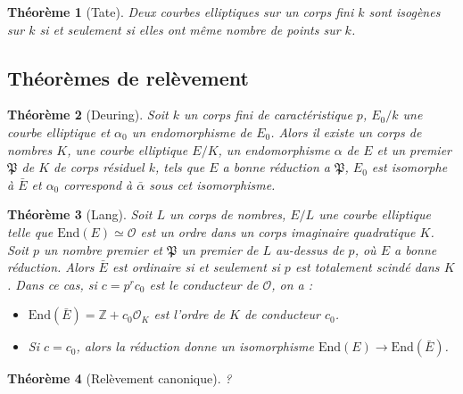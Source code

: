 \documentclass[11pt,a4paper]{article}
\newcommand{\Z}{\mathbb{Z}}
\renewcommand{\O}{\mathcal{O}}
\newcommand{\vers}{\rightarrow}
\newcommand{\End}{\mathrm{End}}
\renewcommand{\frak}{\mathfrak}
\newtheorem{thm}{Théorème}[subsection]
\theoremstyle{definition}
\begin{document}
\begin{thm}[Tate]
Deux courbes elliptiques sur un corps fini $k$ sont isogènes sur $k$ si et seulement si elles ont même nombre de points sur $k$.
\end{thm}

\subsection{Théorèmes de relèvement}

\begin{thm}[Deuring]
Soit $k$ un corps fini de caractéristique $p$, $E_0/k$ une courbe elliptique et $\alpha_0$ un endomorphisme de $E_0$. Alors il existe un corps de nombres $K$, une courbe elliptique $E/K$, un endomorphisme $\alpha$ de $E$ et un premier $\frak P$ de $K$ de corps résiduel $k$, tels que $E$ a bonne réduction a $\frak P$, $E_0$ est isomorphe à $\bar{E}$ et $\alpha_0$ correspond à $\bar{\alpha}$ sous cet isomorphisme.
\end{thm}

\begin{thm}[Lang]
Soit $L$ un corps de nombres, $E/L$ une courbe elliptique telle que $\End(E)\simeq \O$ est un ordre dans un corps imaginaire quadratique $K$. Soit $p$ un nombre premier et $\frak P$ un premier de $L$ au-dessus de $p$, où $E$ a bonne réduction. Alors $\bar{E}$ est ordinaire si et seulement si $p$ est totalement scindé dans $K$. Dans ce cas, si $c=p^r c_0$ est le conducteur de $\O$, on a :
\begin{itemize}
\item[(i)] $\End(\bar{E})=\Z+c_0 \O_K$ est l'ordre de $K$ de conducteur $c_0$.
\item[(ii)] Si $c=c_0$, alors la réduction donne un isomorphisme $\End(E)\vers\End(\bar{E})$.
\end{itemize}
\end{thm}

\begin{thm}[Relèvement canonique]
?
\end{thm}
\end{document}
